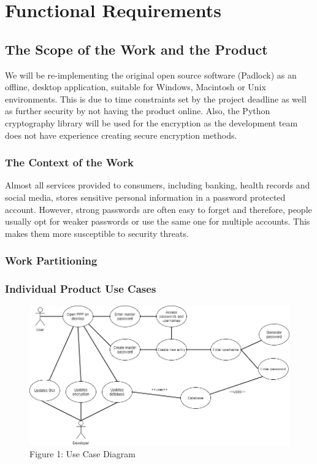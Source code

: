 \documentclass[12pt, titlepage]{article}
\begin{document}
\section{Functional Requirements}

\subsection{The Scope of the Work and the Product}

We will be re-implementing the original open source software (Padlock) as an offline, 
desktop application, suitable for Windows, Macintosh or Unix environments. This is due to time 
constraints set by the project deadline as well as further security by not having the product online. 
Also, the Python cryptography library will be used for the encryption as the development team does not 
have experience creating secure encryption methods. 

\subsubsection{The Context of the Work}

Almost all services provided to consumers, including banking, health records and social media, 
stores sensitive personal information in a password protected account. However, strong passwords are 
often easy to forget and therefore, people usually opt for weaker passwords or use the same 
one for multiple accounts. This makes them more susceptible to security threats.

\subsubsection{Work Partitioning}

\subsubsection{Individual Product Use Cases}

\begin{figure}[h]
\includegraphics{Images/UseCase.png}
\caption{Figure 1: Use Case Diagram}
\end{figure}
\end{document}
